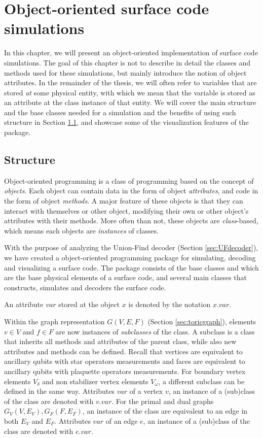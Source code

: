 \chapter{Object-oriented surface code simulations}
In this chapter, we will present an object-oriented implementation of surface code simulations. The goal of this chapter is not to describe in detail the classes and methods used for these simulations, but mainly introduce the notion of object attributes. In the remainder of the thesis, we will often refer to variables that are stored \emph{at} some physical entity, with which we mean that the variable is stored as an attribute at the class instance of that entity. 
We will cover the main structure and the base classes needed for a simulation and the benefits of using such structure in Section \ref{sec:oopstructure}, and showcase some of the visualization features of the package. 

\section{Structure}\label{sec:oopstructure}
Object-oriented programming is a class of programming based on the concept of \emph{objects}. Each object can contain data in the form of object \emph{attributes}, and code in the form of object \emph{methods}. A major feature of these objects is that they can interact with themselves or other object, modifying their own or other object's attributes with their methods. More often than not, these objects are \emph{class}-based, which means each objects are \emph{instances} of classes. 

With the purpose of analyzing the Union-Find decoder (Section \ref{sec:UFdecoder}), we have  created a object-oriented programming package for simulating, decoding and visualizing a surface code. The package consists of the base classes  and  which are the base physical elements of a surface code, and several main classes that constructs, simulates and decoders the surface code. 
\begin{definition}
    An attribute $var$ stored at the object $x$ is denoted by the notation $x.var$. 
\end{definition}
Within the graph representation $G(V,E,F)$ (Section \ref{sec:toricgraph}), elements $v\in V$ and $f\in F$ are now instances of \emph{subclasses} of the  class. A subclass is a class that inherits all methods and attributes of the parent class, while also new attributes and methods can be defined. Recall that vertices are equivalent to ancillary qubits with star operators measurements and faces are equivalent to ancillary qubits with plaquette operators measurements. For boundary vertex elements $V_\delta$ and non stabilizer vertex elements $V_\omega$, a different subclass can be defined in the same way. Attributes $var$ of a vertex $v$, an instance of a (sub)class of the  class are denoted with $v.var$. For the primal and dual graphs $G_V(V,E_V), G_F(F,E_F)$, an instance of the  class are equivalent to an edge in both $E_V$ and $E_F$. Attributes $var$ of an edge $e$, an instance of a (sub)class of the  class are denoted with $e.var$. 

